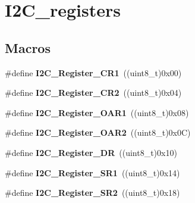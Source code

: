 \hypertarget{group___i2_c__registers}{\section{I2\-C\-\_\-registers}
\label{group___i2_c__registers}
}
\subsection*{Macros}
\begin{DoxyCompactItemize}
\item 
\hypertarget{group___i2_c__registers_ga4b9e7934e490c3540e50cf2f1d0a7688}{\#define {\bfseries I2\-C\-\_\-\-Register\-\_\-\-C\-R1}~((uint8\-\_\-t)0x00)}\label{group___i2_c__registers_ga4b9e7934e490c3540e50cf2f1d0a7688}

\item 
\hypertarget{group___i2_c__registers_gaf278337dd03b6ae56eac3f335381eca3}{\#define {\bfseries I2\-C\-\_\-\-Register\-\_\-\-C\-R2}~((uint8\-\_\-t)0x04)}\label{group___i2_c__registers_gaf278337dd03b6ae56eac3f335381eca3}

\item 
\hypertarget{group___i2_c__registers_ga706317a00c0d450e95c00efd2afe1836}{\#define {\bfseries I2\-C\-\_\-\-Register\-\_\-\-O\-A\-R1}~((uint8\-\_\-t)0x08)}\label{group___i2_c__registers_ga706317a00c0d450e95c00efd2afe1836}

\item 
\hypertarget{group___i2_c__registers_gaffdc1902493456dea95216a39fc54e2b}{\#define {\bfseries I2\-C\-\_\-\-Register\-\_\-\-O\-A\-R2}~((uint8\-\_\-t)0x0\-C)}\label{group___i2_c__registers_gaffdc1902493456dea95216a39fc54e2b}

\item 
\hypertarget{group___i2_c__registers_gaea281721e7a8461d90bf59898487c096}{\#define {\bfseries I2\-C\-\_\-\-Register\-\_\-\-D\-R}~((uint8\-\_\-t)0x10)}\label{group___i2_c__registers_gaea281721e7a8461d90bf59898487c096}

\item 
\hypertarget{group___i2_c__registers_gaf3bc5f4dc87513e2eceba4f503c14d6a}{\#define {\bfseries I2\-C\-\_\-\-Register\-\_\-\-S\-R1}~((uint8\-\_\-t)0x14)}\label{group___i2_c__registers_gaf3bc5f4dc87513e2eceba4f503c14d6a}

\item 
\hypertarget{group___i2_c__registers_ga0b5f7949e449223ec97e0169d79d007d}{\#define {\bfseries I2\-C\-\_\-\-Register\-\_\-\-S\-R2}~((uint8\-\_\-t)0x18)}\label{group___i2_c__registers_ga0b5f7949e449223ec97e0169d79d007d}


\end{DoxyCompactItemize}
